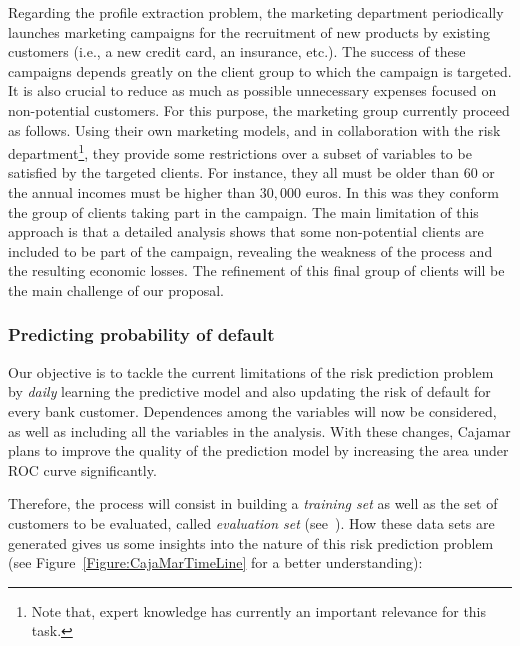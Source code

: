 Regarding the profile extraction problem, the marketing department periodically launches marketing campaigns for the recruitment of new products by existing customers (i.e., a new credit card, an insurance, etc.). The success of these campaigns depends greatly on the client group to which the campaign is targeted. It is also crucial to reduce as much as possible unnecessary expenses focused on non-potential customers.  For this purpose, the marketing group currently proceed as follows. Using their own marketing models, and in collaboration with the risk department\footnote{Note that, expert knowledge has currently an important relevance for this task.}, they provide some restrictions over a subset of variables to be satisfied by the targeted clients. For instance, they all must be older than 60 or the annual incomes must be higher than $30,000$ euros. In this was they conform the group of clients taking part in the campaign. The main limitation of this approach is that a detailed analysis shows that some non-potential clients are included to be part of the campaign, revealing the weakness of the process and the resulting economic losses. The refinement of this final group of clients will be the main challenge of our proposal. 


\subsubsection{Predicting probability of default} \label{SubSection:Predicting}

Our objective is to tackle the current limitations of the risk prediction problem by \textit{daily} learning the predictive model and also updating the risk of default for every bank customer. Dependences among the variables will now be considered, as well as including all the variables in the analysis. With these changes, Cajamar plans to improve the quality of the prediction model by increasing the area under ROC curve significantly.


Therefore, the process will consist in building a \textit{training set} as well as the set of customers to be evaluated, called \textit{evaluation set} (see~\cite{Fer14b}). How these data sets are generated gives us some insights into the nature of this risk prediction problem (see Figure~\ref{Figure:CajaMarTimeLine} for a better understanding):

